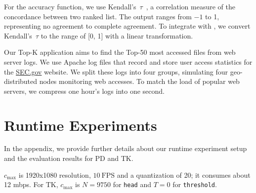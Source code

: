For the accuracy function, we use Kendall's~$\tau$~\cite{abdi2007kendall}, a
correlation measure of the concordance between two ranked list. The output
ranges from \(-1\) to 1, representing no agreement to complete agreement. To
integrate with \sysname{}, we convert Kendall's~$\tau$ to the range of [0, 1]
with a linear transformation.

Our Top-K application aims to find the Top-50 most accessed files from web
server logs. We use Apache log files that record and store user access
statistics for the \href{https://www.sec.gov}{SEC.gov} website. We split these
logs into four groups, simulating four geo-distributed nodes monitoring web
accesses.  To match the load of popular web servers, we compress one hour's logs
into one second.

\section{Runtime Experiments}
\label{appendix:more-runtime}

In the appendix, we provide further details about our runtime experiment setup
and the evaluation results for PD and TK.

$c_{\max}$ is 1920x1080 resolution, \(10~\text{FPS}\) and a quantization of 20;
it consumes about 12 mbps. For TK, $c_{\max}$ is $N=9750$ for \texttt{head} and
$T=0$ for \texttt{threshold}.

